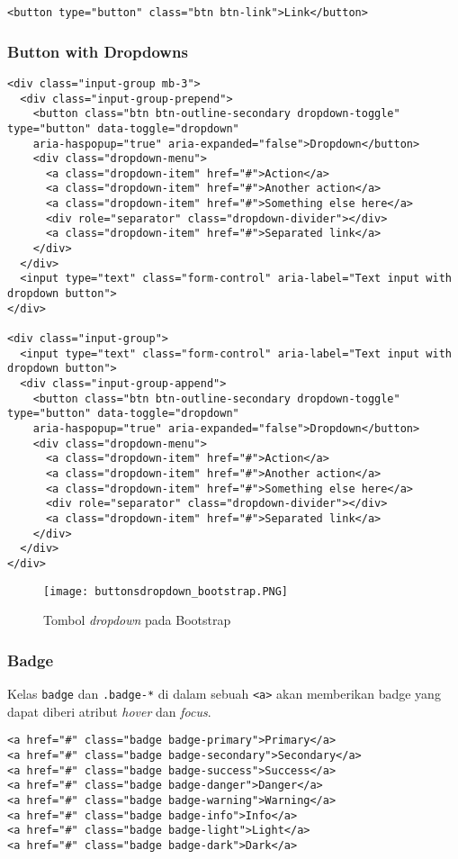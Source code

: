 {\begin{lstlisting}[frame=single]
<button type="button" class="btn btn-link">Link</button>
\end{lstlisting}


\subsubsection{Button with Dropdowns}
\begin{lstlisting}[frame=single, basicstyle=\tiny]
<div class="input-group mb-3">
  <div class="input-group-prepend">
    <button class="btn btn-outline-secondary dropdown-toggle" type="button" data-toggle="dropdown"
    aria-haspopup="true" aria-expanded="false">Dropdown</button>
    <div class="dropdown-menu">
      <a class="dropdown-item" href="#">Action</a>
      <a class="dropdown-item" href="#">Another action</a>
      <a class="dropdown-item" href="#">Something else here</a>
      <div role="separator" class="dropdown-divider"></div>
      <a class="dropdown-item" href="#">Separated link</a>
    </div>
  </div>
  <input type="text" class="form-control" aria-label="Text input with dropdown button">
</div>

<div class="input-group">
  <input type="text" class="form-control" aria-label="Text input with dropdown button">
  <div class="input-group-append">
    <button class="btn btn-outline-secondary dropdown-toggle" type="button" data-toggle="dropdown"
    aria-haspopup="true" aria-expanded="false">Dropdown</button>
    <div class="dropdown-menu">
      <a class="dropdown-item" href="#">Action</a>
      <a class="dropdown-item" href="#">Another action</a>
      <a class="dropdown-item" href="#">Something else here</a>
      <div role="separator" class="dropdown-divider"></div>
      <a class="dropdown-item" href="#">Separated link</a>
    </div>
  </div>
</div>
\end{lstlisting}

\begin{figure} [H]
	\centering  
	\texttt{[image: buttonsdropdown\_bootstrap.PNG]}  
	\caption{Tombol \textit{dropdown} pada Bootstrap} 
\end{figure}

\subsubsection{Badge}
Kelas \texttt{badge} dan \texttt{.badge-*} di dalam sebuah \texttt{<a>} akan memberikan badge yang dapat diberi atribut \textit{hover} dan \textit{focus}. 
\begin{lstlisting}[frame=single, basicstyle=\tiny]
<a href="#" class="badge badge-primary">Primary</a>
<a href="#" class="badge badge-secondary">Secondary</a>
<a href="#" class="badge badge-success">Success</a>
<a href="#" class="badge badge-danger">Danger</a>
<a href="#" class="badge badge-warning">Warning</a>
<a href="#" class="badge badge-info">Info</a>
<a href="#" class="badge badge-light">Light</a>
<a href="#" class="badge badge-dark">Dark</a>
\end{lstlisting}

}
